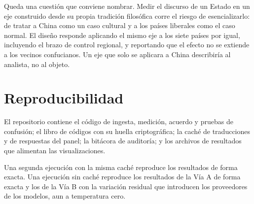 Queda una cuestión que conviene nombrar. Medir el discurso de un Estado en un eje construido desde su propia tradición filosófica corre el riesgo de esencializarlo: de tratar a China como un caso cultural y a los países liberales como el caso normal. El diseño responde aplicando el mismo eje a los siete países por igual, incluyendo el brazo de control regional, y reportando que el efecto no se extiende a los vecinos confucianos. Un eje que solo se aplicara a China describiría al analista, no al objeto.

\section{Reproducibilidad}

El repositorio contiene el código de ingesta, medición, acuerdo y pruebas de confusión; el libro de códigos con su huella criptográfica; la caché de traducciones y de respuestas del panel; la bitácora de auditoría; y los archivos de resultados que alimentan las visualizaciones.

Una segunda ejecución con la misma caché reproduce los resultados de forma exacta. Una ejecución sin caché reproduce los resultados de la Vía A de forma exacta y los de la Vía B con la variación residual que introducen los proveedores de los modelos, aun a temperatura cero.
